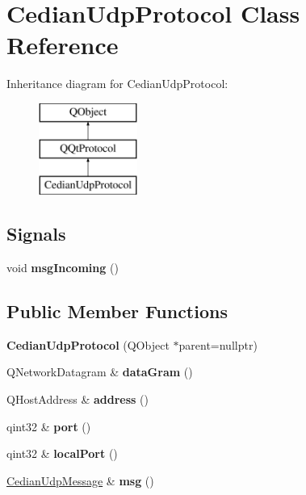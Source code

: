 \hypertarget{class_cedian_udp_protocol}{}\section{Cedian\+Udp\+Protocol Class Reference}
\label{class_cedian_udp_protocol}
Inheritance diagram for Cedian\+Udp\+Protocol\+:\begin{figure}[H]
\begin{center}
\leavevmode
\includegraphics[height=3.000000cm]{class_cedian_udp_protocol}
\end{center}
\end{figure}
\subsection*{Signals}
\begin{DoxyCompactItemize}
\item 
\mbox{\label{class_cedian_udp_protocol_a246b886618d0716e23e089309b390970}} 
void {\bfseries msg\+Incoming} ()
\end{DoxyCompactItemize}
\subsection*{Public Member Functions}
\begin{DoxyCompactItemize}
\item 
\mbox{\label{class_cedian_udp_protocol_a6b8ee3b20fab2a6958aeb0ef6409129e}} 
{\bfseries Cedian\+Udp\+Protocol} (Q\+Object $\ast$parent=nullptr)
\item 
\mbox{\label{class_cedian_udp_protocol_aaaea6105938fe6fea3c8bacba39e6ff3}} 
Q\+Network\+Datagram \& {\bfseries data\+Gram} ()
\item 
\mbox{\label{class_cedian_udp_protocol_ab20862a85abe2ee056e2088603918d91}} 
Q\+Host\+Address \& {\bfseries address} ()
\item 
\mbox{\label{class_cedian_udp_protocol_a4314f8a978982e860919692c4b985f27}} 
qint32 \& {\bfseries port} ()
\item 
\mbox{\label{class_cedian_udp_protocol_a08dd1c4706bf31883020f04504ddb1fa}} 
qint32 \& {\bfseries local\+Port} ()
\item 
\mbox{\label{class_cedian_udp_protocol_adfe85c87b84c77144aac0f4d86a50638}} 
\mbox{\hyperlink{class_cedian_udp_message}{Cedian\+Udp\+Message}} \& {\bfseries msg} ()
\end{DoxyCompactItemize}
